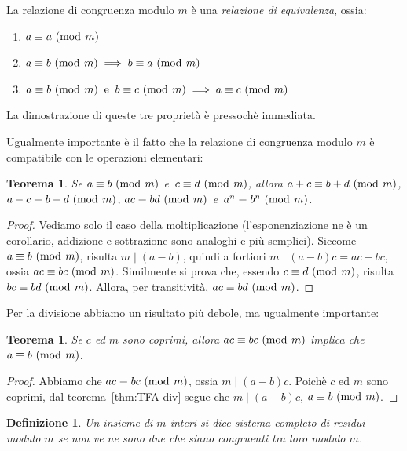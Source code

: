 \documentclass[pdflatex,11pt,a4paper,oneside]{article}
\newcommand{\acro}[1]{\text{{\frenchspacing {#1} }}}
\newcommand{\ie}[0]{\acro{i.e.}}
\newcommand{\p}[1]{\left({#1}\right)}
\newcommand{\divides}[0]{\mid}
\newcommand{\congruent}[0]{\equiv}
\newcommand{\mmodop}[0]{\ensuremath{\operatorname{mod}}}
\newcommand{\mmod}[1]{\ensuremath{\allowbreak\ (\mmodop\:{#1})}}
\newtheorem{theorem}[TheoremLike]{Teorema}
\newtheorem{definition}[TheoremLike]{Definizione}
\begin{document}
La relazione di congruenza modulo $m$ \`e una \emph{relazione di
equivalenza}, ossia:
\begin{enumerate}
\item $a \congruent a \mmod m$
\item $a \congruent b \mmod m \implies b \congruent a \mmod m$
\item $a \congruent b \mmod m ~\:\textrm{e}\:~
       b \congruent c \mmod m \implies
       a \congruent c \mmod m$
\end{enumerate}
La dimostrazione di queste tre propriet\`a \`e pressoch\`e immediata.

\smallskip
Ugualmente importante \`e il fatto che la relazione di congruenza
modulo $m$ \`e compatibile con le operazioni elementari:
%
\begin{theorem}\label{thm:modular-operation}
Se $a \congruent b \mmod m$ e\, $c \congruent d \mmod m$, allora
$a + c \congruent b + d \mmod m$, $a - c \congruent b - d \mmod m$,
$ac \congruent bd \mmod m$ e\, $a^n \congruent b^n \mmod m$.

\end{theorem}
%
\begin{proof}
Vediamo solo il caso della moltiplicazione (l'esponenziazione ne \`e
un corollario, addizione e sottrazione sono analoghi e pi\`u semplici).
Siccome $a \congruent b \mmod m$, risulta $m \divides \p{a - b}$,
quindi a fortiori $m \divides \p{a - b}c = ac - bc$, ossia
$ac \congruent bc \mmod m$.  Similmente si prova che, essendo
$c \congruent d \mmod m$, risulta $bc \congruent bd \mmod m$.
Allora, per transitivit\`a, $ac \congruent bd \mmod m$.
\end{proof}

Per la divisione abbiamo un risultato pi\`u debole, ma ugualmente
importante:
%
\begin{theorem}\label{thm:simplify-modulo-m}
Se $c$ ed $m$ sono coprimi, allora $ac \congruent bc \mmod m$ implica
che $a \congruent b \mmod m$.
\end{theorem}
%
\begin{proof}
Abbiamo che $ac \congruent bc \mmod m$, ossia $m \divides \p{a -b}c$.
Poich\`e $c$ ed $m$ sono coprimi, dal teorema~\eqref{thm:TFA-div}
segue che $m \divides \p{a -b}c$, \ie $a \congruent b \mmod m$.
\end{proof}

\begin{definition}
Un insieme di $m$ interi si dice \emph{sistema completo di residui modulo
$m$} se non ve ne sono due che siano congruenti tra loro modulo $m$.
\end{definition}
\end{document}
